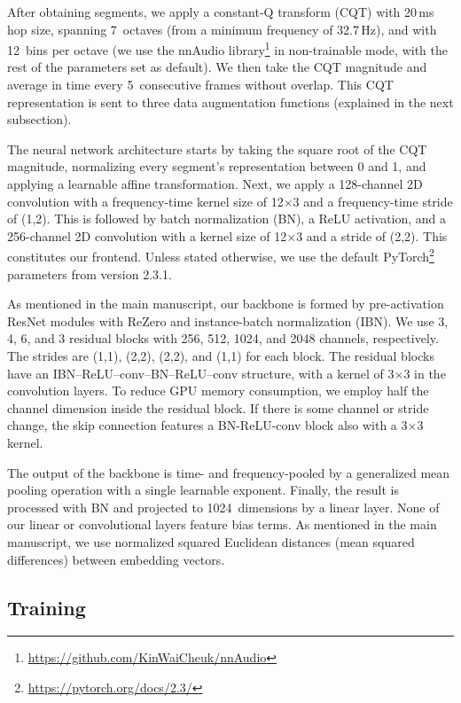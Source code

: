 After obtaining segments, we apply a constant-Q transform (CQT) with 20\,ms hop size, spanning 7~octaves (from a minimum frequency of 32.7\,Hz), and with 12~bins per octave (we use the nnAudio library\footnote{\url{https://github.com/KinWaiCheuk/nnAudio}} in non-trainable mode, with the rest of the parameters set as default). We then take the CQT magnitude and average in time every 5~consecutive frames without overlap. This CQT representation is sent to three data augmentation functions (explained in the next subsection).

The neural network architecture starts by taking the square root of the CQT magnitude, normalizing every segment's representation between 0 and 1, and applying a learnable affine transformation. Next, we apply a 128-channel 2D convolution with a frequency-time kernel size of 12$\times$3 and a frequency-time stride of (1,2). This is followed by batch normalization (BN), a ReLU activation, and a 256-channel 2D convolution with a kernel size of 12$\times$3 and a stride of (2,2). This constitutes our frontend. Unless stated otherwise, we use the default PyTorch\footnote{\url{https://pytorch.org/docs/2.3/}} parameters from version 2.3.1.

As mentioned in the main manuscript, our backbone is formed by pre-activation ResNet modules with ReZero and instance-batch normalization (IBN). We use 3, 4, 6, and 3 residual blocks with 256, 512, 1024, and 2048 channels, respectively. The strides are (1,1), (2,2), (2,2), and (1,1) for each block. The residual blocks have an IBN--ReLU--conv--BN--ReLU--conv structure, with a kernel of 3$\times$3 in the convolution layers. To reduce GPU memory consumption, we employ half the channel dimension inside the residual block. If there is some channel or stride change, the skip connection features a BN-ReLU-conv block also with a 3$\times$3 kernel.

The output of the backbone is time- and frequency-pooled by a generalized mean pooling operation with a single learnable exponent. Finally, the result is processed with BN and projected to 1024~dimensions by a linear layer. None of our linear or convolutional layers feature bias terms. As mentioned in the main manuscript, we use normalized squared Euclidean distances (mean squared differences) between embedding vectors.

\subsection{Training}

